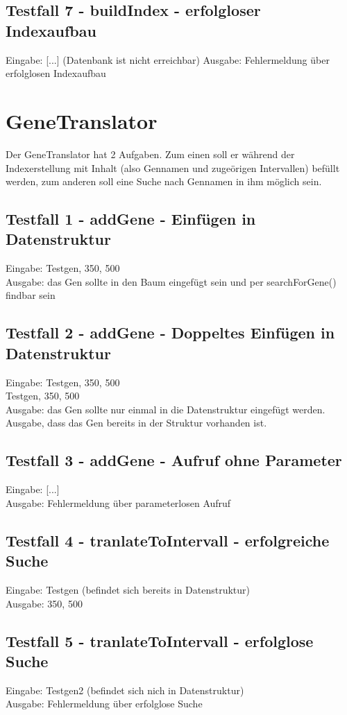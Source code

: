 \documentclass[]{article}
\begin{document}
\subsection{Testfall 7 - buildIndex - erfolgloser Indexaufbau}
Eingabe: [...] (Datenbank ist nicht erreichbar)
Ausgabe: Fehlermeldung über erfolglosen Indexaufbau
\newpage
\section{GeneTranslator}
Der GeneTranslator hat 2 Aufgaben. Zum einen soll er während der Indexerstellung mit Inhalt (also Gennamen und zugeörigen Intervallen) befüllt werden, zum anderen soll eine Suche nach Gennamen in ihm möglich sein.

\subsection{Testfall 1 - addGene - Einfügen in Datenstruktur}
Eingabe: Testgen, 350, 500\\
Ausgabe: das Gen sollte in den Baum eingefügt sein und per searchForGene() findbar sein

\subsection{Testfall 2 - addGene - Doppeltes Einfügen in Datenstruktur}
Eingabe: Testgen, 350, 500\\
		 Testgen, 350, 500\\
Ausgabe: das Gen sollte nur einmal in die Datenstruktur eingefügt werden. Ausgabe, dass das Gen bereits in der Struktur vorhanden ist.

\subsection{Testfall 3 - addGene - Aufruf ohne Parameter}
Eingabe: [...]\\
Ausgabe: Fehlermeldung über  parameterlosen Aufruf

\subsection{Testfall 4 - tranlateToIntervall - erfolgreiche Suche}
Eingabe: Testgen (befindet sich bereits in Datenstruktur)\\
Ausgabe: 350, 500

\subsection{Testfall 5 - tranlateToIntervall - erfolglose Suche}
Eingabe: Testgen2 (befindet sich nich in Datenstruktur)\\
Ausgabe: Fehlermeldung über erfolglose Suche
\end{document}
